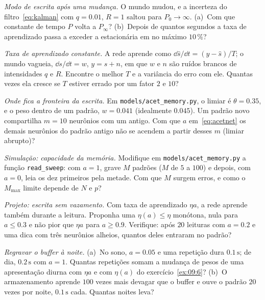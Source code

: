 \begin{exercise}[\lvlB]
\label{ex:09:2}
\emph{Modo de escrita após uma mudança.} O mundo mudou, e a incerteza do filtro~\eqref{eq:kalman} com $q=0.01$, $R=1$ saltou para $P_0\to\infty$. (a)~Com que constante de tempo $P$ volta a $P_\infty$? (b)~Depois de quantos segundos a taxa de aprendizado passa a exceder a estacionária em no máximo $10\,\%$?
\end{exercise}

\begin{exercise}[\lvlB]
\label{ex:09:3}
\emph{Taxa de aprendizado constante.} A rede aprende como $\dd\hat s/\dd t=(y-\hat s)/T$; o mundo vagueia, $\dd s/\dd t=w$, $y=s+n$, em que $w$ e $n$ são ruídos brancos de intensidades $q$ e $R$. Encontre o melhor $T$ e a variância do erro com ele. Quantas vezes ela cresce se $T$ estiver errado por um fator $2$ e $10$?
\end{exercise}

\begin{exercise}[\lvlB]
\label{ex:09:4}
\emph{Onde fica a fronteira da escrita.} Em \texttt{models/\allowbreak acet\_memory.py}, o limiar é $\theta=0.35$, e o peso dentro de um padrão, $w=0.041$ (idealmente $0.045$). Um padrão novo compartilha $m=10$ neurônios com um antigo. Com que $a$ em~\eqref{eq:acetnet} os demais neurônios do padrão antigo não se acendem a partir desses $m$ (limiar abrupto)?
\end{exercise}

\begin{exercise}[\lvlB]
\label{ex:09:5}
\emph{Simulação: capacidade da memória.} Modifique em \texttt{models/\allowbreak acet\_memory.py} a função \texttt{read\_sweep}: com $a=1$, grave $M$ padrões ($M$ de $5$ a $100$) e depois, com $a=0$, leia os dez primeiros pela metade. Com que $M$ surgem erros, e como o $M_{\max}$ limite depende de $N$ e $p$?
\end{exercise}

\begin{exercise}[\lvlB]
\label{ex:09:6}
\emph{Projeto: escrita sem vazamento.} Com taxa de aprendizado $\eta a$, a rede aprende também durante a leitura. Proponha uma $\eta(a)\le\eta$ monótona, nula para $a\le0.3$ e não pior que $\eta a$ para $a\ge0.9$. Verifique: após $20$ leituras com $a=0.2$ e uma dica com três neurônios alheios, quantos deles entraram no padrão?
\end{exercise}

\begin{exercise}[\lvlC]
\label{ex:09:7}
\emph{Regravar o buffer à noite.} (a)~No sono, $a=0.05$ e uma repetição dura $0.1\,\text{s}$; de dia, $0.2\,\text{s}$ com $a=1$. Quantas repetições somam a mudança de pesos de uma apresentação diurna com $\eta a$ e com $\eta(a)$ do exercício~\ref{ex:09:6}? (b)~O armazenamento aprende $100$ vezes mais devagar que o buffer e ouve o padrão $20$ vezes por noite, $0.1\,\text{s}$ cada. Quantas noites leva?
\end{exercise}
